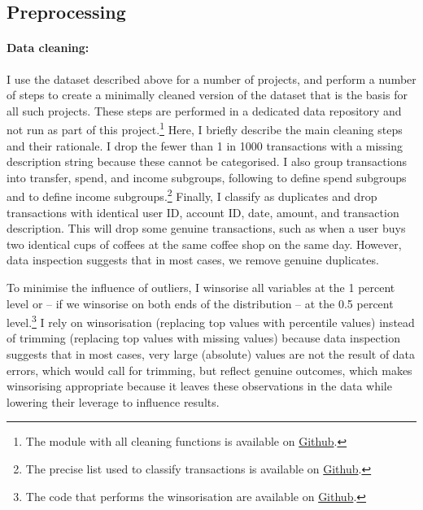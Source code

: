 \subsection{Preprocessing}%
\label{sub:preprocessing}

\paragraph{Data cleaning:}%
\label{par:data_cleaning}

I use the dataset described above for a number of projects, and perform a
number of steps to create a minimally cleaned version of the dataset that is
the basis for all such projects. These steps are performed in a dedicated data
repository and not run as part of this project.\footnote{The module with all
cleaning functions is available on
\href{https://github.com/fabiangunzinger/mdb_eval/blob/5f0346faf9b7058cd29fddd1c6ee9b0988b4fac6/src/data/clean.py}{Github}.}
Here, I briefly describe the main cleaning steps and their rationale. I drop
the fewer than 1 in 1000 transactions with a missing description string because
these cannot be categorised. I also group transactions into transfer, spend,
and income subgroups, following \citet{muggleton2020evidence} to define spend
subgroups and \citet{hacioglu2021distributional} to define income
subgroups.\footnote{ The precise list used to classify transactions is
available on
\href{https://github.com/fabiangunzinger/mdb_eval/blob/92af366d4c4052cc7a7f78a6178086de8ecdfb75/src/data/txn_classifications.py}{Github}.}
Finally, I classify as duplicates and drop transactions with identical user ID,
account ID, date, amount, and transaction description. This will drop some
genuine transactions, such as when a user buys two identical cups of coffees at
the same coffee shop on the same day. However, data inspection suggests that in
most cases, we remove genuine duplicates.

To minimise the influence of outliers, I winsorise all variables at the 1
percent level or -- if we winsorise on both ends of the distribution -- at the
0.5 percent level.\footnote{The code that performs the winsorisation are
    available on
\href{https://github.com/fabiangunzinger/mdb_eval/blob/d04fe186bb5cca884af2b7c1c7ad429674ef701d/src/data/transformers.py}{Github}.}
I rely on winsorisation (replacing top values with percentile values) instead
of trimming (replacing top values with missing values) because data inspection
suggests that in most cases, very large (absolute) values are not the result of
data errors, which would call for trimming, but reflect genuine outcomes, which
makes winsorising appropriate because it leaves these observations in the data
while lowering their leverage to influence results.


